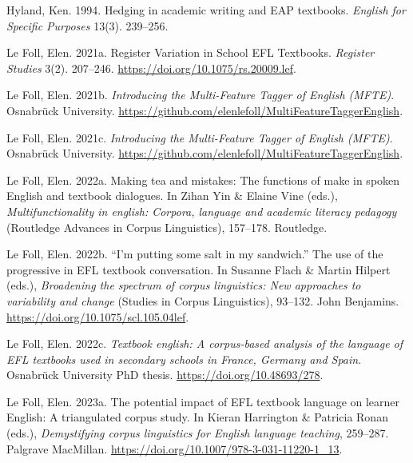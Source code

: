 \documentclass[
  letterpaper,
  DIV=11,
  numbers=noendperiod]{scrreprt}
\newlength{\cslhangindent}
\newenvironment{CSLReferences}[2] %
 {\begin{list}{}{%
  \setlength{\itemindent}{0pt}
  \setlength{\leftmargin}{0pt}
  \setlength{\parsep}{0pt}
  \ifodd #1
   \setlength{\leftmargin}{\cslhangindent}
   \setlength{\itemindent}{-1\cslhangindent}
  \fi
  \setlength{\itemsep}{#2\baselineskip}}}
 {\end{list}}
\begin{document}
\begin{CSLReferences}{1}{0}
Hyland, Ken. 1994. Hedging in academic writing and EAP textbooks.
\emph{{English} for Specific Purposes} 13(3). 239--256.

Le Foll, Elen. 2021a. Register {Variation} in {School} EFL {Textbooks}.
\emph{Register Studies} 3(2). 207--246.
\url{https://doi.org/10.1075/rs.20009.lef}.

Le Foll, Elen. 2021b. \emph{Introducing the {Multi}-{Feature} {Tagger}
of {English} ({MFTE})}. Osnabrück University.
\url{https://github.com/elenlefoll/MultiFeatureTaggerEnglish}.

Le Foll, Elen. 2021c. \emph{Introducing the {Multi}-{Feature} {Tagger}
of {English} ({MFTE})}. Osnabrück University.
\url{https://github.com/elenlefoll/MultiFeatureTaggerEnglish}.

Le Foll, Elen. 2022a. Making tea and mistakes: The functions of make in
spoken {English} and textbook dialogues. In Zihan Yin \& Elaine Vine
(eds.), \emph{Multifunctionality in english: Corpora, language and
academic literacy pedagogy} (Routledge Advances in Corpus Linguistics),
157--178. Routledge.

Le Foll, Elen. 2022b. {``I'm putting some salt in my sandwich.''} The
use of the progressive in EFL textbook conversation. In Susanne Flach \&
Martin Hilpert (eds.), \emph{Broadening the spectrum of corpus
linguistics: New approaches to variability and change} (Studies in
Corpus Linguistics), 93--132. John Benjamins.
\url{https://doi.org/10.1075/scl.105.04lef}.

Le Foll, Elen. 2022c. \emph{Textbook english: A corpus-based analysis of
the language of {EFL} textbooks used in secondary schools in {France},
{Germany} and {Spain}}. Osnabrück University PhD thesis.
\url{https://doi.org/10.48693/278}.

Le Foll, Elen. 2023a. The potential impact of EFL textbook language on
learner {English}: A triangulated corpus study. In Kieran Harrington \&
Patricia Ronan (eds.), \emph{Demystifying corpus linguistics for
{English} language teaching}, 259--287. Palgrave MacMillan.
\url{https://doi.org/10.1007/978-3-031-11220-1_13}.


\end{CSLReferences}
\end{document}
